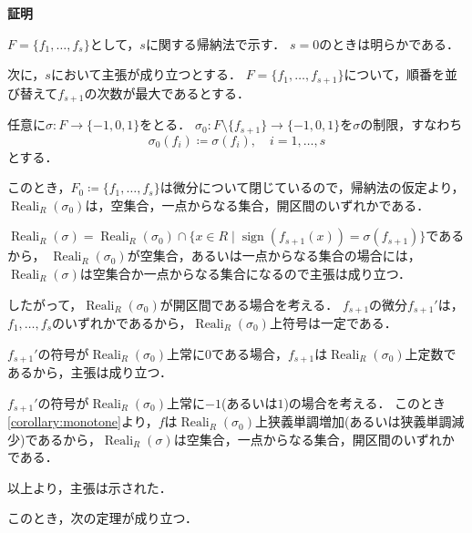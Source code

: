 \documentclass[uplatex, dvipdfmx]{jsarticle}
\makeatletter
\numberwithin{equation}{section}
\renewenvironment{proof}[1][\proofname]{\par
  \pushQED{\qed}%
  \normalfont \topsep6\p@\@plus6\p@\relax
  \trivlist
  \item\relax
  {\bfseries
  #1\@addpunct{.}}\hspace\labelsep\ignorespaces
}{
  \popQED\endtrivlist\@endpefalse
}
\newcommand{\map}[3]{{#1}\colon{#2}\rightarrow{#3}}
\DeclareMathOperator{\Reali}{Reali}
\DeclareMathOperator{\sign}{sign}
\theoremstyle{definition}
\renewcommand{\proofname}{\textbf{証明}}
\makeatother
\begin{document}
\begin{proof}
     $F = \{f_1, \dots, f_s\}$として，$s$に関する帰納法で示す．
     $s = 0$のときは明らかである．
     
     次に，$s$において主張が成り立つとする．
     $F = \{f_1, \dots, f_{s+1}\}$について，順番を並び替えて$f_{s+1}$の次数が最大であるとする．

     任意に$\map{\sigma}{F}{\{-1,0,1\}}$をとる．
     $\map{\sigma_0}{F \setminus \{f_{s+1}\}}{\{-1,0,1\}}$を$\sigma$の制限，すなわち
     \begin{equation}
          \sigma_0(f_i) \coloneqq \sigma(f_i), \quad i=1, \dots, s
     \end{equation}
     とする．

     このとき，$F_0 \coloneqq \{f_1, \dots, f_{s}\}$は微分について閉じているので，帰納法の仮定より，
     $\Reali_R(\sigma_0)$は，空集合，一点からなる集合，開区間のいずれかである．

     $\Reali_R(\sigma) = \Reali_R({\sigma_0}) \cap \{x \in R \mid \sign(f_{s+1}(x)) = \sigma(f_{s+1})\}$であるから，
     $\Reali_R({\sigma_0})$が空集合，あるいは一点からなる集合の場合には，$\Reali_R(\sigma)$は空集合か一点からなる集合になるので主張は成り立つ．

     したがって，$\Reali_R({\sigma_0})$が開区間である場合を考える．
     $f_{s+1}$の微分$f_{s+1}'$は，$f_1, \dots, f_s$のいずれかであるから，$\Reali_R({\sigma_0})$上符号は一定である．

     $f_{s+1}'$の符号が$\Reali_R({\sigma_0})$上常に$0$である場合，$f_{s+1}$は$\Reali_R({\sigma_0})$上定数であるから，主張は成り立つ．

     $f_{s+1}'$の符号が$\Reali_R({\sigma_0})$上常に$-1$(あるいは$1$)の場合を考える．
     このとき\cref{corollary:monotone}より，$f$は$\Reali_R({\sigma_0})$上狭義単調増加(あるいは狭義単調減少)であるから，$\Reali_R(\sigma)$は空集合，一点からなる集合，開区間のいずれかである．

     以上より，主張は示された．
\end{proof}

このとき，次の定理が成り立つ．
\end{document}

